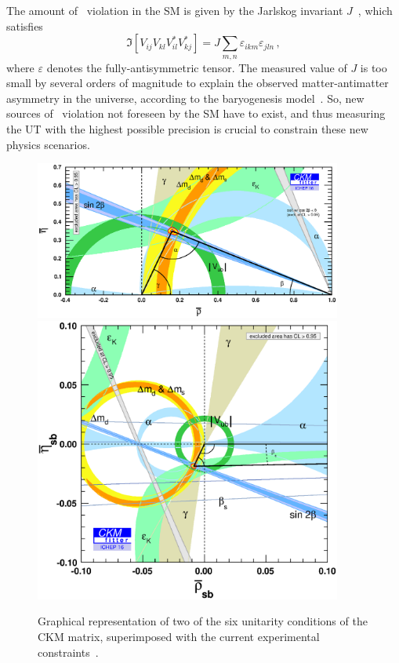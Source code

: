 The amount of \CP~violation in the SM is given by the Jarlskog invariant $J$~\cite{Jarlskog:1985ht}, which satisfies
\begin{equation}
  \Im\left[V_{ij}V_{kl}V^{*}_{il}V^{*}_{kj}\right] = J \sum\limits_{m,n}\varepsilon_{ikm}\varepsilon_{jln}\,,
\end{equation}
where $\varepsilon$ denotes the fully-antisymmetric tensor. The measured value of $J$ is too small by several orders of magnitude to explain the observed matter-antimatter asymmetry in the universe, according to the baryogenesis model~\cite{Sakharov:1967dj}. So, new sources of \CP~violation not foreseen by the SM have to exist, and thus measuring the UT with the highest possible precision is crucial to constrain these new physics scenarios.

\begin{figure}[htbp]
  \begin{center}
    \includegraphics[width=0.9\textwidth]{02CKM/figs/ut.eps} \\
    \includegraphics[width=0.9\textwidth]{02CKM/figs/ut_s.eps} \\
  \end{center}
  \vspace{-2mm}
  \caption{Graphical representation of two of the six unitarity conditions of the CKM matrix, superimposed with the current experimental constraints~\cite{CKMfitter2015}.}
  \label{fig:ut}
\end{figure}
